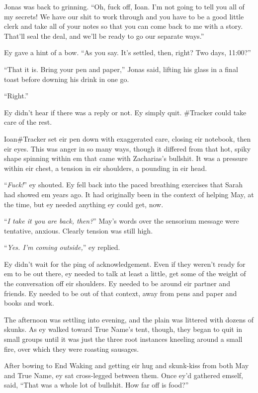 Jonas was back to grinning. ``Oh, fuck off, Ioan. I'm not going to tell you all of my secrets! We have our shit to work through and you have to be a good little clerk and take all of your notes so that you can come back to me with a story. That'll seal the deal, and we'll be ready to go our separate ways.''

Ey gave a hint of a bow. ``As you say. It's settled, then, right? Two days, 11:00?''

``That it is. Bring your pen and paper,'' Jonas said, lifting his glass in a final toast before downing his drink in one go.

``Right.''

Ey didn't hear if there was a reply or not. Ey simply quit. \#Tracker could take care of the rest.

Ioan\#Tracker set eir pen down with exaggerated care, closing eir notebook, then eir eyes. This was anger in so many ways, though it differed from that hot, spiky shape spinning within em that came with Zacharias's bullshit. It was a pressure within eir chest, a tension in eir shoulders, a pounding in eir head.

``\emph{Fuck!}'' ey shouted. Ey fell back into the paced breathing exercises that Sarah had showed em years ago. It had originally been in the context of helping May, at the time, but ey needed anything ey could get, now.

``\emph{I take it you are back, then?}'' May's words over the sensorium message were tentative, anxious. Clearly tension was still high.

``\emph{Yes. I'm coming outside,}'' ey replied.

Ey didn't wait for the ping of acknowledgement. Even if they weren't ready for em to be out there, ey needed to talk at least a little, get some of the weight of the conversation off eir shoulders. Ey needed to be around eir partner and friends. Ey needed to be out of that context, away from pens and paper and books and work.

The afternoon was settling into evening, and the plain was littered with dozens of skunks. As ey walked toward True Name's tent, though, they began to quit in small groups until it was just the three root instances kneeling around a small fire, over which they were roasting sausages.

After bowing to End Waking and getting eir hug and skunk-kiss from both May and True Name, ey sat cross-legged between them. Once ey'd gathered emself, said, ``That was a whole lot of bullshit. How far off is food?''


